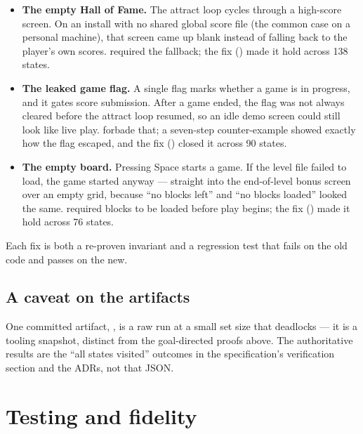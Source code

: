 \documentclass[11pt,a4paper]{article}
\begin{document}
\begin{itemize}[nosep]
  \item \textbf{The empty Hall of Fame.} The attract loop cycles through a
        high-score screen. On an install with no shared global score file
        (the common case on a personal machine), that screen came up blank
        instead of falling back to the player's own scores.
         required the fallback; the fix ()
        made it hold across 138 states.
  \item \textbf{The leaked game flag.} A single flag marks whether a game is
        in progress, and it gates score submission. After a game ended, the
        flag was not always cleared before the attract loop resumed, so an
        idle demo screen could still look like live play. 
        forbade that; a seven-step counter-example showed exactly how the
        flag escaped, and the fix () closed it across 90 states.
  \item \textbf{The empty board.} Pressing Space starts a game. If the level
        file failed to load, the game started anyway --- straight into the
        end-of-level bonus screen over an empty grid, because ``no blocks
        left'' and ``no blocks loaded'' looked the same. 
        required blocks to be loaded before play begins; the fix ()
        made it hold across 76 states.
\end{itemize}

Each fix is both a re-proven invariant and a regression test that fails on
the old code and passes on the new.

\subsection{A caveat on the artifacts}

One committed artifact,
, is a raw
 run at a small set size that deadlocks --- it is a
tooling snapshot, distinct from the goal-directed proofs above. The
authoritative results are the ``all states visited'' outcomes in the
specification's verification section and the ADRs, not that JSON.

\section{Testing and fidelity}
\end{document}
